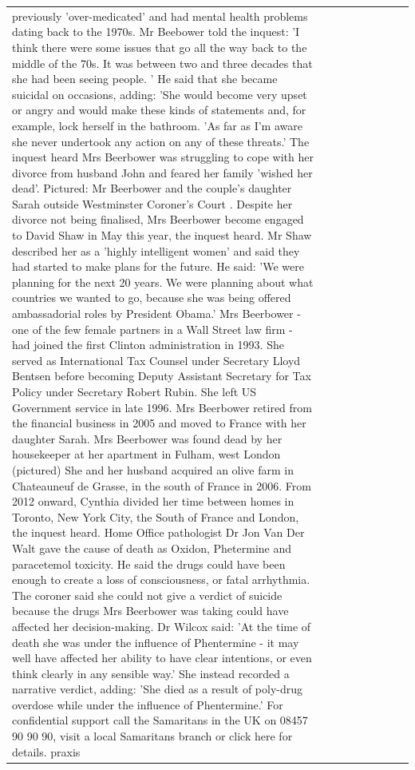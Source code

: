 \begin{table}[H]
\begin{tabular}{lllrlllll}
previously 'over-medicated' and had mental health problems dating back to the 1970s. Mr Beebower told the inquest: 'I think there were some issues that go all the way back to the middle of the 70s. It was between two and three decades that she had been seeing people. ' He said that she became suicidal on occasions, adding: 'She would become very upset or angry and would make these kinds of statements and, for example, lock herself in the bathroom. 'As far as I'm aware she never undertook any action on any of these threats.' The inquest heard Mrs Beerbower was struggling to cope with her divorce from husband John and feared her family 'wished her dead'. Pictured: Mr Beerbower and the couple's daughter Sarah outside Westminster Coroner's Court . Despite her divorce not being finalised, Mrs Beerbower become engaged to David Shaw in May this year, the inquest heard. Mr Shaw described her as a 'highly intelligent women' and said they had started to make plans for the future. He said: 'We were planning for the next 20 years. We were planning about what countries we wanted to go, because she was being offered ambassadorial roles by President Obama.' Mrs Beerbower - one of the few female partners in a Wall Street law firm - had joined the first Clinton administration in 1993. She served as International Tax Counsel under Secretary Lloyd Bentsen before becoming Deputy Assistant Secretary for Tax Policy under Secretary Robert Rubin. She left US Government service in late 1996. Mrs Beerbower retired from the financial business in 2005 and moved to France with her daughter Sarah. Mrs Beerbower was found dead by her housekeeper at her apartment in Fulham, west London (pictured) She and her husband acquired an olive farm in Chateauneuf de Grasse, in the south of France in 2006. From 2012 onward, Cynthia divided her time between homes in Toronto, New York City, the South of France and London, the inquest heard. Home Office pathologist Dr Jon Van Der Walt gave the cause of death as Oxidon, Phetermine and paracetemol toxicity. He said the drugs could have been enough to create a loss of consciousness, or fatal arrhythmia. The coroner said she could not give a verdict of suicide because the drugs Mrs Beerbower was taking could have affected her decision-making. Dr Wilcox said: 'At the time of death she was under the influence of Phentermine - it may well have affected her ability to have clear intentions, or even think clearly in any sensible way.' She instead recorded a narrative verdict, adding: 'She died as a result of poly-drug overdose while under the influence of Phentermine.' For confidential support call the Samaritans in the UK on 08457 90 90 90, visit a local Samaritans branch or click here for details. praxis \\

\end{tabular}
\end{table}

